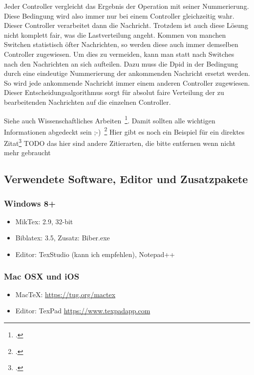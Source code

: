 Jeder Controller vergleicht das Ergebnis der Operation mit seiner Nummerierung. Diese Bedingung wird also immer nur bei einem Controller gleichzeitig wahr. Dieser Controller verarbeitet dann die Nachricht. 
Trotzdem ist auch diese Lösung nicht komplett fair, was die Lastverteilung angeht. Kommen von manchen Switchen statistisch öfter Nachrichten, so werden diese auch immer demselben Controller zugewiesen. Um dies zu vermeiden, 
kann man statt nach Switches nach den Nachrichten an sich aufteilen. Dazu muss die Dpid in der Bedingung durch eine eindeutige Nummerierung der ankommenden Nachricht ersetzt werden. 
So wird jede ankommende Nachricht immer einem anderen Controller zugewiesen. Dieser Entscheidungsalgorithmus sorgt für absolut faire Verteilung der zu bearbeitenden Nachrichten auf die einzelnen Controller.






Siehe auch Wissenschaftliches Arbeiten~\footcite[\vglf][S. 1]{Balzert.2008}. %
Damit sollten alle wichtigen Informationen abgedeckt sein ;-)~\footcite[\vglf][]{Balzert.2008} %
Hier gibt es noch ein Beispiel für ein direktes Zitat\footcite[][]{Balzert.2008} %
TODO das hier sind andere Zitierarten, die bitte entfernen wenn nicht mehr gebraucht






\subsection{Verwendete Software, Editor und Zusatzpakete}
\subsubsection{Windows 8+}
\begin{itemize}
\item MikTex: 2.9, 32-bit
\item Biblatex: 3.5, Zusatz: Biber.exe
\item Editor: TexStudio (kann ich empfehlen), Notepad++
\end{itemize}

\subsubsection{Mac OSX und iOS}
\begin{itemize}
\item MacTeX: \url{https://tug.org/mactex}
\item Editor: TexPad \url{https://www.texpadapp.com}
\end{itemize}

